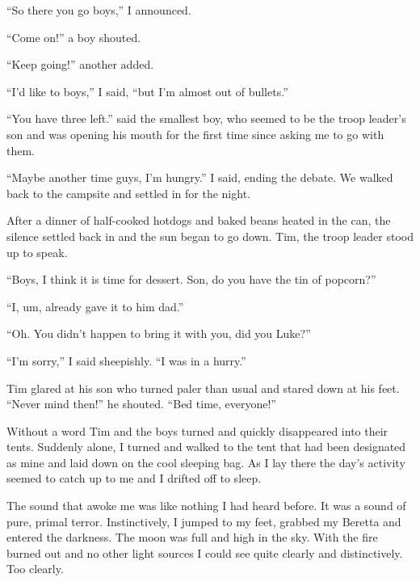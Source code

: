 ``So there you go boys,'' I announced.



``Come on!'' a boy shouted.



``Keep going!'' another added.



``I'd like to boys,'' I said, ``but I'm almost out of bullets.''



``You have three left.'' said the smallest boy, who seemed to be the
troop leader's son and was opening his mouth for the first time
since asking me to go with them.



``Maybe another time guys, I'm hungry.'' I said, ending the debate.
We walked back to the campsite and settled in for the night.



After a dinner of half-cooked hotdogs and baked beans heated in the
can, the silence settled back in and the sun began to go down. Tim,
the troop leader stood up to speak.



``Boys, I think it is time for dessert. Son, do you have the tin of
popcorn?''



``I, um, already gave it to him dad.''



``Oh. You didn't happen to bring it with you, did you Luke?''



``I'm sorry,'' I said sheepishly. ``I was in a hurry.''



Tim glared at his son who turned paler than usual and stared down
at his feet. ``Never mind then!'' he shouted. ``Bed time,
everyone!''



Without a word Tim and the boys turned and quickly disappeared into
their tents. Suddenly alone, I turned and walked to the tent that
had been designated as mine and laid down on the cool sleeping bag.
As I lay there the day's activity seemed to catch up to me and I
drifted off to sleep.



The sound that awoke me was like nothing I had heard before. It was
a sound of pure, primal terror. Instinctively, I jumped to my feet,
grabbed my Beretta and entered the darkness. The moon was full and
high in the sky. With the fire burned out and no other light
sources I could see quite clearly and distinctively. Too
clearly.



